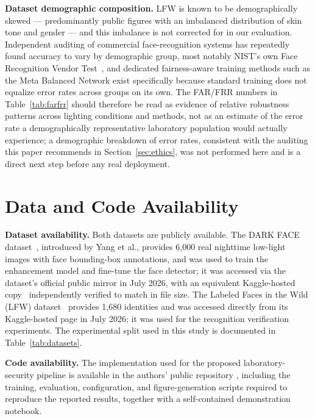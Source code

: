 \documentclass[conference]{IEEEtran}
\begin{document}
\textbf{Dataset demographic composition.} LFW is known to be
demographically skewed --- predominantly public figures with an
imbalanced distribution of skin tone and gender --- and this
imbalance is not corrected for in our evaluation. Independent
auditing of commercial face-recognition systems has repeatedly
found accuracy to vary by demographic group, most notably NIST's
own Face Recognition Vendor Test~\cite{nistfrvt}, and dedicated
fairness-aware training methods such as the Meta Balanced Network
\cite{metabalanced} exist specifically because standard training
does not equalize error rates across groups on its own. The
FAR/FRR
numbers in Table~\ref{tab:farfrr} should therefore be read as
evidence of relative robustness patterns across lighting
conditions and methods, not as an estimate of the error rate a
demographically representative laboratory population would
actually experience; a demographic breakdown of error rates,
consistent with the auditing this paper recommends in
Section~\ref{sec:ethics}, was not performed here and is a
direct next step before any real deployment.

\section{Data and Code Availability}
\label{sec:dataavailability}
\textbf{Dataset availability.} Both datasets are publicly
available. The DARK FACE dataset~\cite{darkface}, introduced by
Yang et al., provides 6{,}000 real nighttime low-light images
with face bounding-box annotations, and was used to train the
enhancement model and fine-tune the face detector; it was
accessed via the dataset's official public mirror in July 2026,
with an equivalent Kaggle-hosted copy~\cite{darkface_data}
independently verified to match in file size. The Labeled Faces
in the Wild (LFW) dataset~\cite{lfw_data} provides 1{,}680
identities and was accessed directly from its Kaggle-hosted page
in July 2026; it was used for the recognition verification
experiments. The experimental split used in
this study is documented in Table~\ref{tab:datasets}.

\textbf{Code availability.} The implementation used for the proposed
laboratory-security pipeline is available in the authors' public
repository \cite{labsecurity}, including the training, evaluation,
configuration, and figure-generation scripts required to reproduce
the reported results, together with a self-contained demonstration
notebook.
\end{document}
